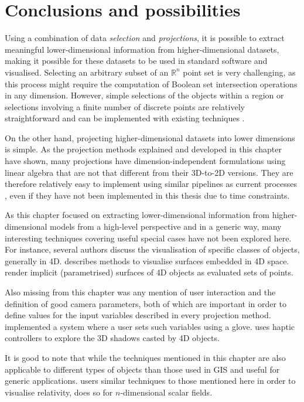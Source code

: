 \section{Conclusions and possibilities}
\label{se:slicing-conclusions}

Using a combination of data \emph{selection} and \emph{projections}, it is possible to extract meaningful lower-dimensional information from higher-dimensional datasets, making it possible for these datasets to be used in standard software and visualised.
Selecting an arbitrary subset of an $\mathbb{R}^n$ point set is very challenging, as this process might require the computation of Boolean set intersection operations in any dimension.
However, simple selections of the objects within a region or selections involving a finite number of discrete points are relatively straightforward and can be implemented with existing techniques \citep{Hanson94}.

On the other hand, projecting higher-dimensional datasets into lower dimensions is simple.
As the projection methods explained and developed in this chapter have shown, many projections have dimension-independent formulations using linear algebra that are not that different from their 3D-to-2D versions.
They are therefore relatively easy to implement using similar pipelines as current processes \citep{Chu09}, even if they have not been implemented in this thesis due to time constraints.

As this chapter focused on extracting lower-dimensional information from higher-dimensional models from a high-level perspective and in a generic way, many interesting techniques covering useful special cases have not been explored here.
For instance, several authors discuss the visualisation of specific classes of objects, generally in 4D.
\citet{Hoffmann90} describes methods to visualise surfaces embedded in 4D space.
\citet{Balsys07} render implicit (parametrised) surfaces of 4D objects as evaluated sets of points.

Also missing from this chapter was any mention of user interaction and the definition of good camera parameters, both of which are important in order to define values for the input variables described in every projection method.
\citet{Feiner90} implemented a system where a user sets such variables using a glove.
\citet{Zhang07} uses haptic controllers to explore the 3D shadows casted by 4D objects.

It is good to note that while the techniques mentioned in this chapter are also applicable to different types of objects than those used in GIS and useful for generic applications.
\citet{Hanson01} users similar techniques to those mentioned here in order to visualise relativity, \citet{Bajaj98} does so for $n$-dimensional scalar fields.